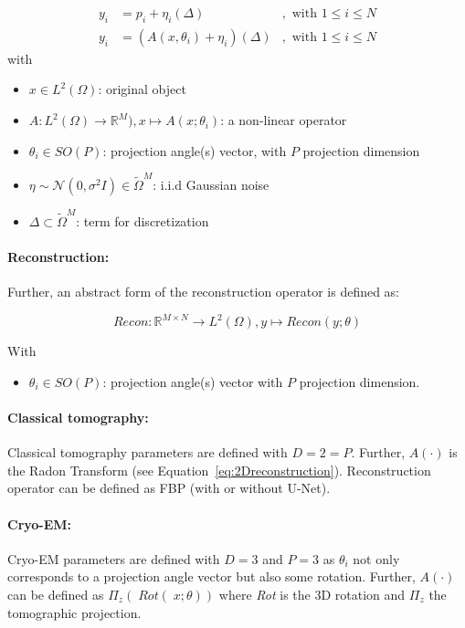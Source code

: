 \begin{equation}
    \label{eq:abstract-model}
    \begin{aligned}
        y_i &= p_i + \eta_i (\Delta) &, \text{ with } 1 \leq i \leq N \\
        y_i &= \left( A(x, \theta_i) + \eta_i \right) (\Delta) &, \text{ with } 1 \leq i \leq N 
    \end{aligned}
\end{equation}
with
\begin{itemize}
    \item $x \in L^2(\Omega)$: original object
    \item $A: L^2(\Omega) \to \mathbb{R}^M), x \mapsto A(x; \theta_i)$: a non-linear operator 
    \item $\theta_i \in SO(P)$: projection angle(s) vector, with $P$ projection dimension
    \item $\eta \sim \mathcal{N}(0, \sigma^2 I) \in \tilde{\Omega}^M$: i.i.d Gaussian noise
    \item $\Delta \subset \tilde{\Omega}^{M}$: term for discretization
\end{itemize}

\paragraph{Reconstruction:}

Further, an abstract form of the reconstruction operator is defined as:

\begin{equation}
    \textit{Recon} : \mathbb{R}^{M \times N} \to L^2(\Omega), y \mapsto Recon(y; \theta)
\end{equation}

With
\begin{itemize}
    \item $\theta_i \in SO(P)$: projection angle(s) vector with $P$ projection dimension.
\end{itemize}

\paragraph{Classical tomography:}
Classical tomography parameters are defined with $D=2=P$.
Further, $A(\cdot)$ is the Radon Transform (see Equation~\ref{eq:2Dreconstruction}).
Reconstruction operator can be defined as FBP (with or without U-Net).

\paragraph{Cryo-EM:}
Cryo-EM parameters are defined with $D=3$ and $P=3$ as $\theta_i$ not only corresponds to
a projection angle vector but also some rotation. Further, $A(\cdot)$ can be
defined as $\Pi_z \left(\; \textit{Rot}(\;x; \theta) \right)$ 
where \textit{Rot} is the 3D rotation and $\Pi_z$ the tomographic projection.


